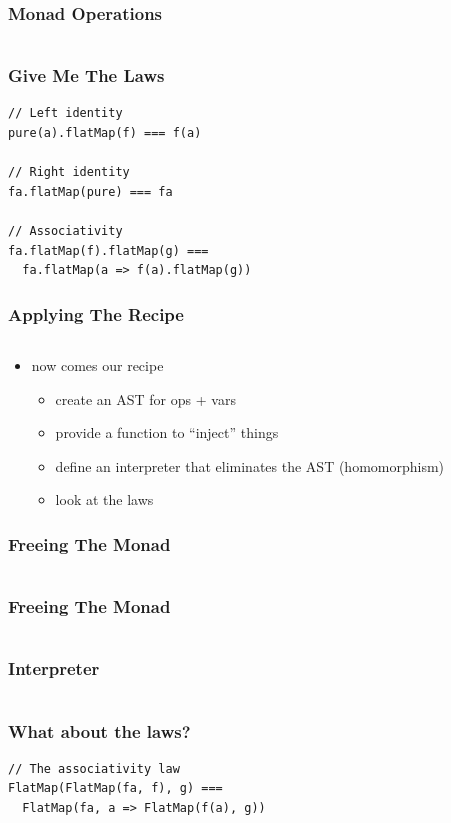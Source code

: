 \documentclass{beamer}
\newcommand{\recipe}{%
  \begin{itemize}
  \item create an AST for ops + vars
  \item provide a function to ``inject'' things
  \item define an interpreter that eliminates the AST (homomorphism)
  \item look at the laws
  \end{itemize}
}
\begin{document}
\begin{frame}[fragile]
  \frametitle{Monad Operations}
  \begin{center}
    \inputminted{scala}{snippets/monad-typeclass.scala}
  \end{center}
\end{frame}

\begin{frame}[fragile]
  \frametitle{Give Me The Laws}
    \begin{center}
\begin{verbatim}
// Left identity
pure(a).flatMap(f) === f(a)

// Right identity
fa.flatMap(pure) === fa

// Associativity
fa.flatMap(f).flatMap(g) ===
  fa.flatMap(a => f(a).flatMap(g))
\end{verbatim}
    \end{center}
\end{frame}

\begin{frame}[fragile]
  \frametitle{Applying The Recipe}
  \begin{center}
    \inputminted{scala}{snippets/monad-typeclass.scala}
  \end{center}
  \begin{itemize}
  \item now comes our recipe
    \recipe{}
  \end{itemize}
\end{frame}

\begin{frame}[fragile]
  \frametitle{Freeing The Monad}
  \begin{center}
    \inputminted{scala}{snippets/free-monad.scala}
  \end{center}
\end{frame}

\begin{frame}[fragile]
  \frametitle{Freeing The Monad}
  \begin{center}
    \inputminted{scala}{snippets/free-instance.scala}
  \end{center}
\end{frame}

\begin{frame}[fragile]
  \frametitle{Interpreter}
  \inputminted{scala}{snippets/free-interp.scala}
\end{frame}

\begin{frame}[fragile]
  \frametitle{What about the laws?}
  \begin{verbatim}
// The associativity law
FlatMap(FlatMap(fa, f), g) ===
  FlatMap(fa, a => FlatMap(f(a), g))
  \end{verbatim}
  \vfill{}
  \inputminted[autogobble]{scala}{snippets/what-about-laws.scala}
\end{frame}
\end{document}
